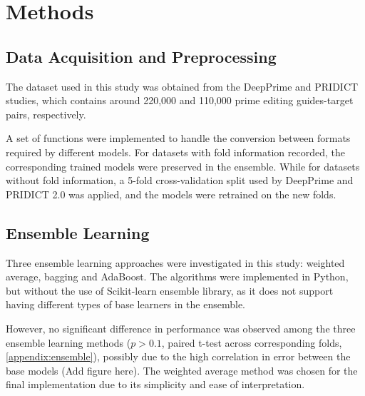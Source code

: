 \section{Methods}

\subsection*{Data Acquisition and Preprocessing}

The dataset used in this study was obtained from the DeepPrime and PRIDICT studies\cite{mathisPredictingPrimeEditing2023,mathisMachineLearningPrediction2024,yuPredictionEfficienciesDiverse2023}, which contains around 220,000 and 110,000 prime editing guides-target pairs, respectively.

A set of functions were implemented to handle the conversion between formats required by different models. For datasets with fold information recorded, the corresponding trained models were preserved in the ensemble. While for datasets without fold information, a 5-fold cross-validation split used by DeepPrime and PRIDICT 2.0 was applied, and the models were retrained on the new folds.

\subsection*{Ensemble Learning}

Three ensemble learning approaches were investigated in this study: weighted average, bagging and AdaBoost. The algorithms were implemented in Python, but without the use of Scikit-learn ensemble library, as it does not support having different types of base learners in the ensemble.  


However, no significant difference in performance was observed among the three ensemble learning methods ($p>0.1$, paired t-test across corresponding folds, \autoref{appendix:ensemble}), possibly due to the high correlation in error between the base models (Add figure here). The weighted average method was chosen for the final implementation due to its simplicity and ease of interpretation.